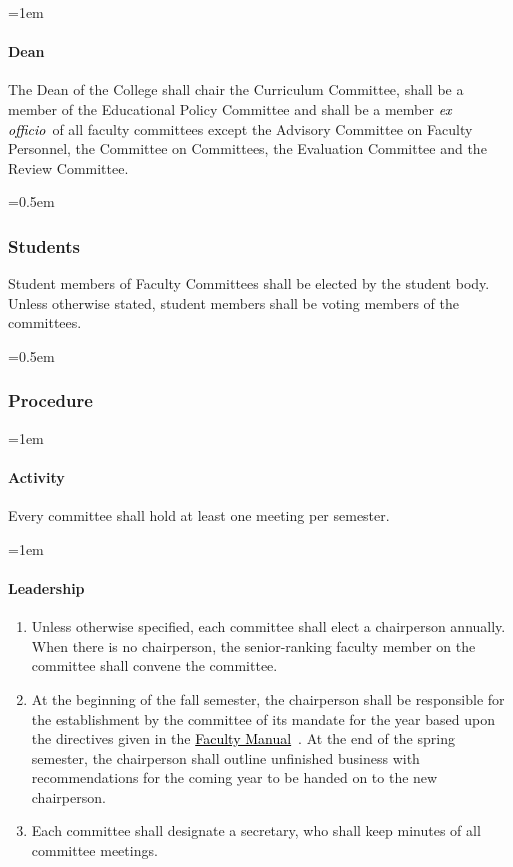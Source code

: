 \documentclass{manual}
\newcommand{\keyword}[1]{\textcolor{black}{#1}}
\newcommand{\facman}{\keyword{\underline{Faculty Manual}}~}
\newcommand{\exoff}{\keyword{\textit{ex officio}}~}
\let\oldsubsubsection\subsubsection
\renewcommand\subsubsection{\leftskip=0.5em\oldsubsubsection}
\let\oldparagraph\paragraph
\renewcommand\paragraph{\leftskip=1em\oldparagraph}
\newcommand{\itemLevelA}{\alph*.}
\newcommand{\itemRefA}{\alph*}
\begin{document}
\paragraph{Dean}
The Dean of the College shall chair the Curriculum Committee, shall be a member of the Educational Policy Committee and shall be a member \exoff of all faculty committees except the Advisory Committee on Faculty Personnel, the Committee on Committees, the Evaluation Committee and the Review Committee.

\subsubsection{Students}
Student members of Faculty Committees shall be elected by the student body. Unless otherwise stated, student members shall be voting members of the committees.

\subsubsection{Procedure}
\paragraph{Activity}
Every committee shall hold at least one meeting per semester.

\paragraph{Leadership}

\begin{enumerate}[label=\itemLevelA,ref=\itemRefA]
\item Unless otherwise specified, each committee shall elect a chairperson annually. When there is no chairperson, the senior-ranking faculty member on the committee shall convene the committee.

\item At the beginning of the fall semester, the chairperson shall be responsible for the establishment by the committee of its mandate for the year based upon the directives given in the \facman. At the end of the spring semester, the chairperson shall outline unfinished business with recommendations for the coming year to be handed on to the new chairperson.

\item Each committee shall designate a secretary, who shall keep minutes of all committee meetings.
\end{enumerate}
\end{document}
